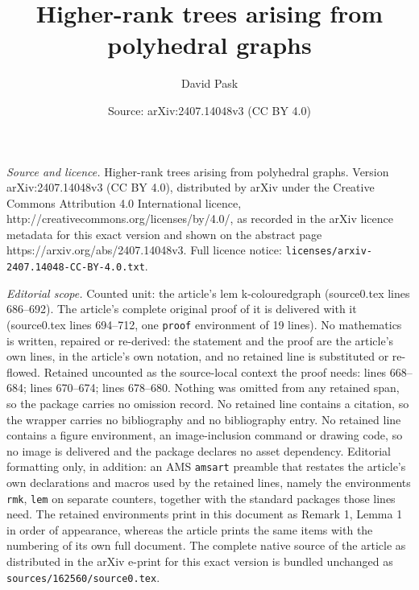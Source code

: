 \documentclass[10pt,a4paper]{amsart}
\title{Higher-rank trees arising from polyhedral graphs}
\author{David Pask}
\date{Source: arXiv:2407.14048v3 (CC BY 4.0)}
\begin{document}
\maketitle

\noindent\emph{Source and licence.} Higher-rank trees arising from polyhedral graphs. Version arXiv:2407.14048v3 (CC BY 4.0), distributed by arXiv under the Creative Commons Attribution 4.0 International licence, http://creativecommons.org/licenses/by/4.0/, as recorded in the arXiv licence metadata for this exact version and shown on the abstract page https://arxiv.org/abs/2407.14048v3. Full licence notice: \texttt{licenses/arxiv-2407.14048-CC-BY-4.0.txt}.\par\smallskip

\noindent\textit{Editorial scope.} Counted unit: the article's lem k-colouredgraph (source0.tex lines 686--692). The article's complete original proof of it is delivered with it (source0.tex lines 694--712, one \texttt{proof} environment of 19 lines). No mathematics is written, repaired or re-derived: the statement and the proof are the article's own lines, in the article's own notation, and no retained line is substituted or re-flowed.  Retained uncounted as the source-local context the proof needs: lines 668--684; lines 670--674; lines 678--680.  Nothing was omitted from any retained span, so the package carries no omission record.  No retained line contains a citation, so the wrapper carries no bibliography and no bibliography entry.  No retained line contains a figure environment, an image-inclusion command or drawing code, so no image is delivered and the package declares no asset dependency.  Editorial formatting only, in addition: an AMS \texttt{amsart} preamble that restates the article's own declarations and macros used by the retained lines, namely the environments \texttt{rmk}, \texttt{lem} on separate counters, together with the standard packages those lines need.  The retained environments print in this document as Remark 1, Lemma 1 in order of appearance, whereas the article prints the same items with the numbering of its own full document.  The complete native source of the article as distributed in the arXiv e-print for this exact version is bundled unchanged as \texttt{sources/162560/source0.tex}.
\end{document}
